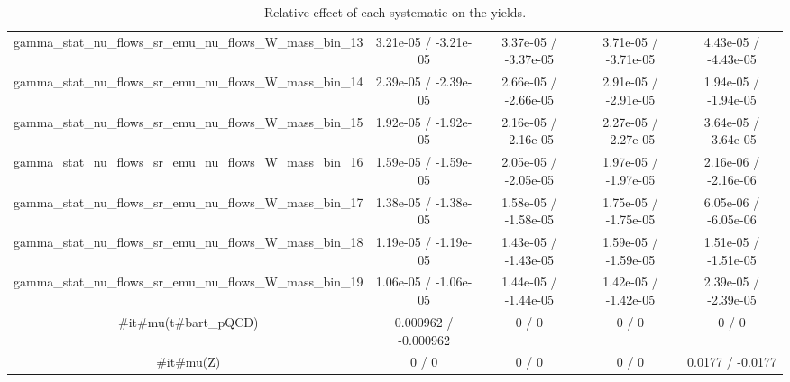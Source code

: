 \documentclass[10pt]{article}
\begin{document}
\begin{table}[htbp]
\begin{center}
\begin{tabular}{|c|c|c|c|c|}
  gamma_stat_nu_flows_sr_emu_nu_flows_W_mass_bin_13 & 3.21e-05 / -3.21e-05 & 3.37e-05 / -3.37e-05 & 3.71e-05 / -3.71e-05 & 4.43e-05 / -4.43e-05 \\ 
  gamma_stat_nu_flows_sr_emu_nu_flows_W_mass_bin_14 & 2.39e-05 / -2.39e-05 & 2.66e-05 / -2.66e-05 & 2.91e-05 / -2.91e-05 & 1.94e-05 / -1.94e-05 \\ 
  gamma_stat_nu_flows_sr_emu_nu_flows_W_mass_bin_15 & 1.92e-05 / -1.92e-05 & 2.16e-05 / -2.16e-05 & 2.27e-05 / -2.27e-05 & 3.64e-05 / -3.64e-05 \\ 
  gamma_stat_nu_flows_sr_emu_nu_flows_W_mass_bin_16 & 1.59e-05 / -1.59e-05 & 2.05e-05 / -2.05e-05 & 1.97e-05 / -1.97e-05 & 2.16e-06 / -2.16e-06 \\ 
  gamma_stat_nu_flows_sr_emu_nu_flows_W_mass_bin_17 & 1.38e-05 / -1.38e-05 & 1.58e-05 / -1.58e-05 & 1.75e-05 / -1.75e-05 & 6.05e-06 / -6.05e-06 \\ 
  gamma_stat_nu_flows_sr_emu_nu_flows_W_mass_bin_18 & 1.19e-05 / -1.19e-05 & 1.43e-05 / -1.43e-05 & 1.59e-05 / -1.59e-05 & 1.51e-05 / -1.51e-05 \\ 
  gamma_stat_nu_flows_sr_emu_nu_flows_W_mass_bin_19 & 1.06e-05 / -1.06e-05 & 1.44e-05 / -1.44e-05 & 1.42e-05 / -1.42e-05 & 2.39e-05 / -2.39e-05 \\ 
  #it{#mu}(t#bar{t}_{pQCD}) & 0.000962 / -0.000962 & 0 / 0 & 0 / 0 & 0 / 0 \\ 
  #it{#mu}(Z) & 0 / 0 & 0 / 0 & 0 / 0 & 0.0177 / -0.0177 \\ 
\hline 
\end{tabular} 
\caption{Relative effect of each systematic on the yields.} 
\end{center} 
\end{table} 
\end{document}
